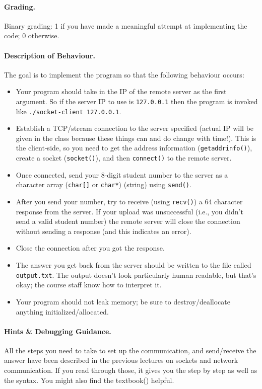 \paragraph{Grading.} Binary grading: 1 if you have made a meaningful attempt at implementing the code; 0 otherwise.

\paragraph{Description of Behaviour.} The goal is to implement the program so that the following behaviour occurs:

\begin{itemize}
	\item Your program should take in the IP of the remote server as the first argument. So if the server IP to use is \texttt{127.0.0.1} then the program is invoked like \texttt{./socket-client 127.0.0.1}. 
	\item Establish a TCP/stream connection to the server specified (actual IP will be given in the class because these things can and do change with time!). This is the client-side, so you need to get the address information (\texttt{getaddrinfo()}), create a socket (\texttt{socket()}), and then \texttt{connect()} to the remote server. 
	\item Once connected, send your 8-digit student number to the server as a character array (\texttt{char[]} or \texttt{char*}) (string) using \texttt{send()}.
	\item After you send your number, try to receive (using \texttt{recv()}) a 64 character response from the server. If your upload was unsuccessful (i.e., you didn't send a valid student number) the remote server will close the connection without sending a response (and this indicates an error).
	\item Close the connection after you got the response.
	\item The answer you get back from the server should be written to the file called \texttt{output.txt}. The output doesn't look particularly human readable, but that's okay; the course staff know how to interpret it.
	\item Your program should not leak memory; be sure to destroy/deallocate anything initialized/allocated.
\end{itemize}


\paragraph{Hints \& Debugging Guidance.}
All the steps you need to take to set up the communication, and send/receive the answer have been described in the previous lectures on sockets and network communication. If you read through those, it gives you the step by step as well as the syntax. You might also find the textbook(\cite{apunix}) helpful.

